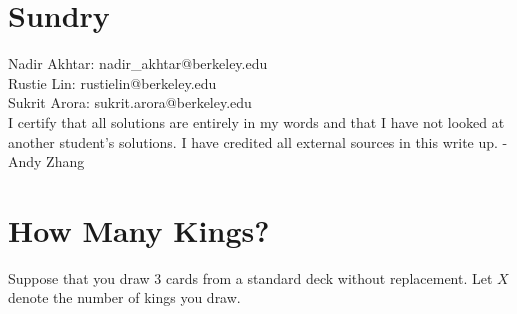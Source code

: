 \documentclass[11pt]{article}
\newcommand*{\Question}[1]{\section{#1}}
\begin{document}
\Question{Sundry} 
\vspace{10pt}
\noindent Nadir Akhtar: nadir\_akhtar@berkeley.edu\\
Rustie Lin: rustielin@berkeley.edu\\
Sukrit Arora: sukrit.arora@berkeley.edu\\

I certify that all solutions are entirely in my words and that I have not looked at another student’s
solutions. I have credited all external sources in this write up. - Andy Zhang
\vfill\pagebreak[3]

\Question{How Many Kings?}

Suppose that you draw 3 cards from a standard deck without replacement. Let $X$ denote the number of kings you draw.
\end{document}
